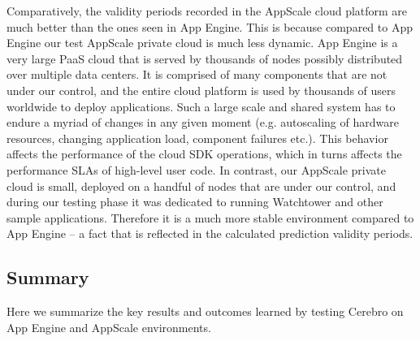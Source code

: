 Comparatively, the validity periods recorded in the AppScale
cloud platform are much better than the ones seen in App Engine. This is because compared to App Engine our
test AppScale private cloud is much less dynamic. App Engine is a very large PaaS cloud that is served by thousands of
nodes possibly distributed over multiple data centers. It is comprised of many components that are not under our control,
and the entire cloud platform is used by thousands of users worldwide to deploy applications. Such a large scale and
shared system has to endure a myriad of changes in any given moment (e.g. autoscaling of hardware resources, 
changing application load, component failures etc.). This behavior affects the performance of the cloud SDK operations, which
in turns affects the performance SLAs of high-level user code. In contrast, our AppScale
private cloud is small, deployed on a handful of nodes that are under our control, and during our testing phase it was dedicated
to running Watchtower and other sample applications. Therefore it is a much more stable environment compared to 
App Engine -- a fact that is reflected in the calculated prediction validity periods. 

\subsection{Summary}
Here we summarize the key results and outcomes learned by testing Cerebro on App Engine and AppScale environments.